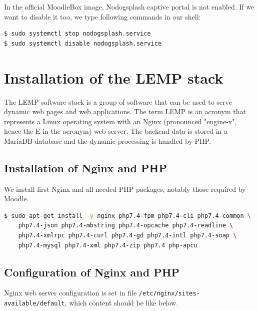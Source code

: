 \documentclass[12pt]{article}
\begin{document}
In the official MoodleBox image, Nodogsplash captive portal is not enabled.
If we want to disable it too, we type following commands in our shell:
\begin{lstlisting}[language=bash]
$ sudo systemctl stop nodogsplash.service
$ sudo systemctl disable nodogsplash.service
\end{lstlisting}

\section{Installation of the LEMP stack}

The LEMP software stack is a group of software that can be used to serve dynamic web pages and web applications.
The term LEMP is an acronym that represents a Linux operating system with an Nginx (pronounced "engine-x", hence the E in the acronym) web server.
The backend data is stored in a MariaDB database and the dynamic processing is handled by PHP.

\subsection{Installation of Nginx and PHP}\label{ssec-lemp}

We install first Nginx and all needed PHP packages, notably those required by Moodle.

\begin{lstlisting}[language=bash]
$ sudo apt-get install -y nginx php7.4-fpm php7.4-cli php7.4-common \
    php7.4-json php7.4-mbstring php7.4-opcache php7.4-readline \
    php7.4-xmlrpc php7.4-curl php7.4-gd php7.4-intl php7.4-soap \
    php7.4-mysql php7.4-xml php7.4-zip php7.4 php-apcu
\end{lstlisting}

\subsection{Configuration of Nginx and PHP}\label{ssec-nginx-php}

Nginx web server configuration is set in file \lstinline{/etc/nginx/sites-available/default}, which content should be like below.

\end{document}
